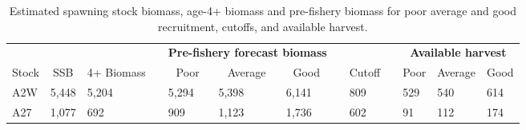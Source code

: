 %
\begin{table}[!tbp]
 \small
 \caption{Estimated spawning stock biomass,  age-4+ biomass and pre-fishery
			biomass for poor average and good recruitment,  cutoffs,  and 
			available harvest.\label{TableCatchAdvice}} 
 \begin{center}
 \begin{tabular}{lllclllclclll}\hline\hline
\multicolumn{3}{c}{\bfseries }&
\multicolumn{1}{c}{\bfseries }&
\multicolumn{3}{c}{\bfseries Pre-fishery forecast biomass}&
\multicolumn{1}{c}{\bfseries }&
\multicolumn{1}{c}{\bfseries }&
\multicolumn{1}{c}{\bfseries }&
\multicolumn{3}{c}{\bfseries Available harvest}
\tabularnewline \cline{1-13}
\multicolumn{1}{c}{Stock}&\multicolumn{1}{c}{SSB}&\multicolumn{1}{c}{4+ Biomass}&\multicolumn{1}{c}{}&\multicolumn{1}{c}{Poor}&\multicolumn{1}{c}{Average}&\multicolumn{1}{c}{Good}&\multicolumn{1}{c}{}&\multicolumn{1}{c}{Cutoff}&\multicolumn{1}{c}{}&\multicolumn{1}{c}{Poor}&\multicolumn{1}{c}{Average}&\multicolumn{1}{c}{Good}\tabularnewline
\hline
A2W&5,448&5,204&&5,294&5,398&6,141&&  809&&  529&  540&  614\tabularnewline
A27&1,077&  692&&  909&1,123&1,736&&  602&&   91&  112&  174\tabularnewline
\hline
\end{tabular}

\end{center}

\end{table}

